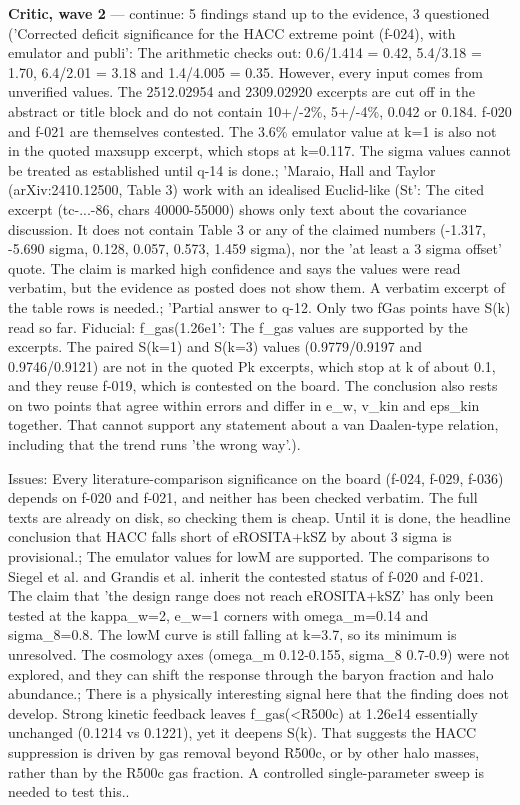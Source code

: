 \documentclass[11pt,a4paper]{article}
\begin{document}
\textbf{Critic, wave 2} --- continue: 5 findings stand up to the evidence, 3 questioned ('Corrected deficit significance for the HACC extreme point (f-024), with emulator and publi': The arithmetic checks out: 0.6/1.414 = 0.42, 5.4/3.18 = 1.70, 6.4/2.01 = 3.18 and 1.4/4.005 = 0.35. However, every input comes from unverified values. The 2512.02954 and 2309.02920 excerpts are cut off in the abstract or title block and do not contain 10+/-2\%, 5+/-4\%, 0.042 or 0.184. f-020 and f-021 are themselves contested. The 3.6\% emulator value at k=1 is also not in the quoted maxsupp excerpt, which stops at k=0.117. The sigma values cannot be treated as established until q-14 is done.; 'Maraio, Hall and Taylor (arXiv:2410.12500, Table 3) work with an idealised Euclid-like (St': The cited excerpt (tc-...-86, chars 40000-55000) shows only text about the covariance discussion. It does not contain Table 3 or any of the claimed numbers (-1.317, -5.690 sigma, 0.128, 0.057, 0.573, 1.459 sigma), nor the 'at least a 3 sigma offset' quote. The claim is marked high confidence and says the values were read verbatim, but the evidence as posted does not show them. A verbatim excerpt of the table rows is needed.; 'Partial answer to q-12. Only two fGas points have S(k) read so far. Fiducial: f\_gas(1.26e1': The f\_gas values are supported by the excerpts. The paired S(k=1) and S(k=3) values (0.9779/0.9197 and 0.9746/0.9121) are not in the quoted Pk excerpts, which stop at k of about 0.1, and they reuse f-019, which is contested on the board. The conclusion also rests on two points that agree within errors and differ in e\_w, v\_kin and eps\_kin together. That cannot support any statement about a van Daalen-type relation, including that the trend runs 'the wrong way'.).

Issues: Every literature-comparison significance on the board (f-024, f-029, f-036) depends on f-020 and f-021, and neither has been checked verbatim. The full texts are already on disk, so checking them is cheap. Until it is done, the headline conclusion that HACC falls short of eROSITA+kSZ by about 3 sigma is provisional.; The emulator values for lowM are supported. The comparisons to Siegel et al. and Grandis et al. inherit the contested status of f-020 and f-021. The claim that 'the design range does not reach eROSITA+kSZ' has only been tested at the kappa\_w=2, e\_w=1 corners with omega\_m=0.14 and sigma\_8=0.8. The lowM curve is still falling at k=3.7, so its minimum is unresolved. The cosmology axes (omega\_m 0.12-0.155, sigma\_8 0.7-0.9) were not explored, and they can shift the response through the baryon fraction and halo abundance.; There is a physically interesting signal here that the finding does not develop. Strong kinetic feedback leaves f\_gas(\textless{}R500c) at 1.26e14 essentially unchanged (0.1214 vs 0.1221), yet it deepens S(k). That suggests the HACC suppression is driven by gas removal beyond R500c, or by other halo masses, rather than by the R500c gas fraction. A controlled single-parameter sweep is needed to test this..
\end{document}
